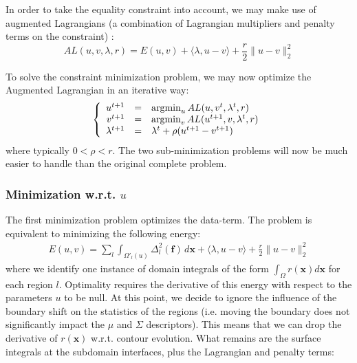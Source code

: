 In order to take the equality constraint into account, we may make use of 
augmented Lagrangians (a combination of Lagrangian multipliers and penalty 
terms on the constraint) \cite{bertsekas_multiplier_1976,
glowinski_augmented_1989,nocedal_numerical_2006}:
\begin{equation}
AL(u,v,\lambda,r) = E(u,v) + \langle \lambda, u-v \rangle + \frac{r}{2} \| u - v \|_2^2
\end{equation}

To solve the constraint minimization problem, we may now optimize the 
Augmented Lagrangian in an iterative way:
\begin{equation}
\left\lbrace 
\begin{array}{rcl}
u^{t+1} &=& \operatorname{argmin}_{u} AL(u,v^t,\lambda^t,r)\\
v^{t+1} &=& \operatorname{argmin}_{v} AL(u^{t+1},v,\lambda^t,r)\\
\lambda^{t+1} &=& \lambda^t + \rho(u^{t+1}-v^{t+1})
\end{array}\right.
\end{equation}
where typically $0 < \rho < r$. The two sub-minimization problems will 
now be much easier to handle than the original complete problem.

\subsubsection{Minimization w.r.t. $u$}
The first minimization problem optimizes the data-term. The problem is equivalent 
to minimizing the following energy:
\begin{multline}
E(u,v) = \sum\limits_l \int_{\Omega'_l(u)} \Delta^2_l (\mathbf{f}) \,d\mathbf{x}
+ \langle \lambda, u-v \rangle + \frac{r}{2} \| u - v \|_2^2
\end{multline}
where we identify one instance of domain integrals of the form $\int_\Omega r(\mathbf{x}) 
d\mathbf{x}$ for each region $l$. Optimality requires the derivative of this energy 
with respect to the parameters $u$ to be null. At this point, we decide to ignore 
the influence of the boundary shift on the statistics of the regions (i.e. moving the 
boundary does not significantly impact the $\mu$ and $\Sigma$ descriptors). This means 
that we can drop the derivative of $r(\mathbf{x})$ w.r.t. contour evolution. 
What remains are the surface integrals at the subdomain interfaces, plus the Lagrangian 
and penalty terms:

